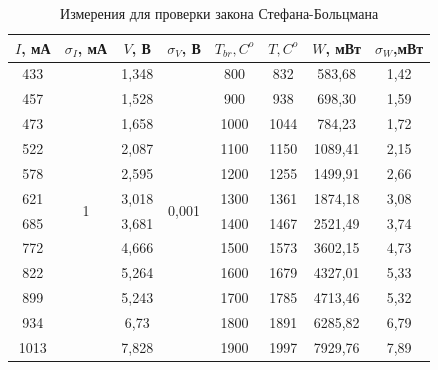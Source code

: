 \documentclass[a4paper,12pt]{report}
\begin{document}
\begin{table}[H]
\begin{tabular}{|c|c|c|c|c|c|c|c|}
\hline
$I$, мА & $\sigma_{I}$, мА          & $V$, В  & $\sigma_{V}$, В               & $T_{br}, C^{o}$ & $T, C^{o}$ & $W$, мВт  & $\sigma_{W}$,мВт \\ \hline
433   & \multirow{12}{*}{1} & 1,348 & \multirow{12}{*}{0,001} & 800        & 832      & 583,68  & 1,42       \\ \cline{1-1} \cline{3-3} \cline{5-8} 
457   &                     & 1,528 &                         & 900        & 938      & 698,30  & 1,59       \\ \cline{1-1} \cline{3-3} \cline{5-8} 
473   &                     & 1,658 &                         & 1000       & 1044     & 784,23  & 1,72       \\ \cline{1-1} \cline{3-3} \cline{5-8} 
522   &                     & 2,087 &                         & 1100       & 1150     & 1089,41 & 2,15       \\ \cline{1-1} \cline{3-3} \cline{5-8} 
578   &                     & 2,595 &                         & 1200       & 1255     & 1499,91 & 2,66       \\ \cline{1-1} \cline{3-3} \cline{5-8} 
621   &                     & 3,018 &                         & 1300       & 1361     & 1874,18 & 3,08       \\ \cline{1-1} \cline{3-3} \cline{5-8} 
685   &                     & 3,681 &                         & 1400       & 1467     & 2521,49 & 3,74       \\ \cline{1-1} \cline{3-3} \cline{5-8} 
772   &                     & 4,666 &                         & 1500       & 1573     & 3602,15 & 4,73       \\ \cline{1-1} \cline{3-3} \cline{5-8} 
822   &                     & 5,264 &                         & 1600       & 1679     & 4327,01 & 5,33       \\ \cline{1-1} \cline{3-3} \cline{5-8} 
899   &                     & 5,243 &                         & 1700       & 1785     & 4713,46 & 5,32       \\ \cline{1-1} \cline{3-3} \cline{5-8} 
934   &                     & 6,73  &                         & 1800       & 1891     & 6285,82 & 6,79       \\ \cline{1-1} \cline{3-3} \cline{5-8} 
1013  &                     & 7,828 &                         & 1900       & 1997     & 7929,76 & 7,89       \\ \hline
\end{tabular}
\caption{Измерения для проверки закона Стефана-Больцмана}
\end{table}
\end{document}
